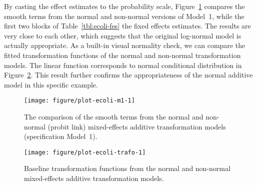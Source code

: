 \documentclass[11pt]{article}\usepackage[]{graphicx}\usepackage{xcolor}
\newenvironment{knitrout}{}{} %
\newcommand{\0}{{\mathbf{0}}}
\begin{document}
By casting the effect estimates to the probability scale,
Figure~\ref{fig:ecoli-nonnorm} compares the smooth terms from
the normal and non-normal versions of Model~1,
while the first two blocks of Table~\ref{tbl:ecoli-fes} the fixed effects estimates.
The results are very close to each other,
which suggests that the original log-normal model is actually appropriate.
As a built-in visual normality check,
we can compare the fitted transformation functions
of the normal and non-normal transformation models.
The linear function corresponds
to normal conditional distribution in Figure~\ref{fig:ecoli-trafo}.
This result further confirms the appropriateness
of the normal additive model in this specific example.





\begin{figure}[!ht]
  \centering

\begin{knitrout}\small
{}\color{fgcolor}
\texttt{[image: figure/plot-ecoli-m1-1]} 
\end{knitrout}

\caption{The comparison of the smooth terms from the normal
  and non-normal (probit link) mixed-effects additive transformation models
  (specification Model~1).
}\label{fig:ecoli-nonnorm}
\end{figure}

\begin{figure}[!ht]
\centering

\begin{knitrout}\small
{}\color{fgcolor}
\texttt{[image: figure/plot-ecoli-trafo-1]} 
\end{knitrout}

\caption{Baseline transformation functions
  from the normal and non-normal mixed-effects
  additive transformation models.}\label{fig:ecoli-trafo}
\end{figure}
\end{document}
